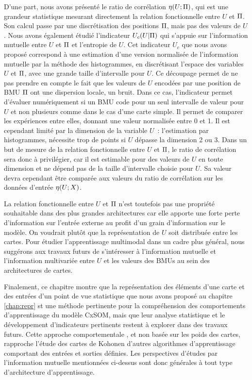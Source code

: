 \documentclass[../main]{subfiles}
\begin{document}
D'une part, nous avons présenté le ratio de corrélation $\eta(U;\Pi)$, qui est une grandeur statistique mesurant directement la relation fonctionnelle entre $U$ et $\Pi$. Son calcul passe par une discrétisation des positions $\Pi$, mais pas des valeurs de $U$. 
Nous avons également étudié l'indicateur $U_c(U|\Pi)$ qui s'appuie sur l'information mutuelle entre $U$ et $\Pi$ et l'entropie de $U$.
Cet indicateur $U_c$ que nous avons proposé correspond à une estimation d'une version normalisée de l'information mutuelle par la méthode des histogrammes, en discrétisant l'espace des variables $U$ et $\Pi$, avec une grande taille d'intervalle pour $U$. 
Ce découpage permet de ne pas prendre en compte le fait que les valeurs de $U$ encodées par une position de BMU $\Pi$ ont une dispersion locale, un bruit. Dans ce cas, l'indicateur permet d'évaluer numériquement si un BMU code pour un seul intervalle de valeur pour $U$ et non plusieurs comme dans le cas d'une carte simple. Il permet de comparer les expériences entre elles, donnant une valeur normalisée entre 0 et 1.
Il est cependant limité par la dimension de la variable $U$~: l'estimation par histogrammes, nécessite trop de points si $U$ dépasse la dimension 2 ou 3.
Dans un but de mesure de la relation fonctionnelle entre $U$ et $\Pi$, le ratio de corrélation sera donc à privilégier, car il est estimable pour des valeurs de $U$ en toute dimension et ne dépend pas de la taille d'intervalle choisie pour $U$. Sa valeur devra cependant être comparée aux valeurs du ratio de corrélation sur les données d'entrée $\eta(U;X)$.


La relation fonctionnelle entre $U$ et $\Pi$ n'est toutefois pas une propriété souhaitable dans des plus grandes architectures car elle apporte une forte perte d'information sur l'entrée externe au profit d'un grain d'information sur le modèle. On voudrait plutôt que la représentation de $U$ soit distribuée entre les cartes.
Pour étudier l'apprentissage multimodal dans un cadre plus général, nous suggérons aux travaux futurs de s'intéresser à l'information mutuelle et l'information multivariée entre $U$ et les valeurs des BMUs au sein des architectures de cartes.

Finalement, ce chapitre montre que la représentation des éléments d'une carte et des entrées d'un point de vue statistique que nous avons proposé au chapitre \ref{chap:repr} st une méthode pertinente pour la compréhension des comportements d'apprentissage du modèle CxSOM, mais que leur analyse statistique et le développement d'indicateurs pertinents restent à explorer dans des travaux futurs.
Cette approche \og comportementale \fg{}, et non basée sur les poids des cartes, rapproche l'étude des cartes de Kohonen d'autres algorithmes d'apprentissage comportant des entrées et sorties définies.
Les perspectives d'études par l'information mutuelle mentionnées ci-dessus sont donc générales à tout type d'architecture d'apprentissage. 

\ifSubfilesClassLoaded{
    \printbibliography
}{}
\end{document}
